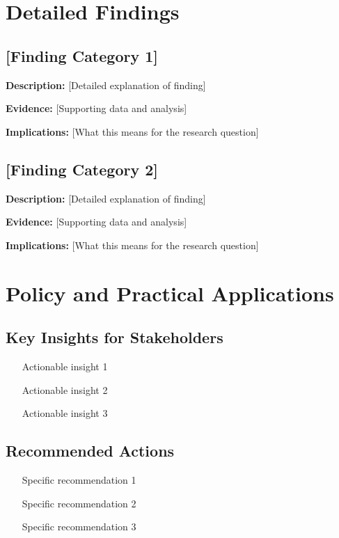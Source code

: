 \documentclass[11pt,letterpaper]{article}
\begin{document}
\section{Detailed Findings}

\subsection{[Finding Category 1]}

\textbf{Description:} [Detailed explanation of finding]

\textbf{Evidence:} [Supporting data and analysis]

\textbf{Implications:} [What this means for the research question]

\subsection{[Finding Category 2]}

\textbf{Description:} [Detailed explanation of finding]

\textbf{Evidence:} [Supporting data and analysis]

\textbf{Implications:} [What this means for the research question]

\section{Policy and Practical Applications}

\subsection{Key Insights for Stakeholders}
\begin{itemize}
    \item [Actionable insight 1]
    \item [Actionable insight 2]
    \item [Actionable insight 3]
\end{itemize}

\subsection{Recommended Actions}
\begin{enumerate}
    \item [Specific recommendation 1]
    \item [Specific recommendation 2]
    \item [Specific recommendation 3]
\end{enumerate}
\end{document}

